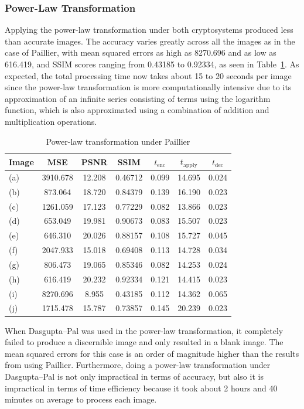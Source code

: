 \subsubsection{Power-Law Transformation}
Applying the power-law transformation under both cryptosystems produced less than accurate images. The accuracy varies greatly across all the images as in the case of Paillier, with mean squared errors as high as 8270.696 and as low as 616.419, and SSIM scores ranging from 0.43185 to 0.92334, as seen in Table~\ref{tbl:pwr-pal}. As expected, the total processing time now takes about 15 to 20 seconds per image since the power-law transformation is more computationally intensive due to its approximation of an infinite series consisting of terms using the logarithm function, which is also approximated using a combination of addition and multiplication operations.

\begin{table}[h]
	\centering
	\caption{Power-law transformation under Paillier}
	\label{tbl:pwr-pal}
    \begin{tabular}{lcccccc}
        \toprule
        Image & MSE  & PSNR & SSIM & $t_\text{enc}$ & $t_\text{apply}$ & $t_\text{dec}$ \\ \midrule
        (a) & 3910.678 & 12.208 & 0.46712 & 0.099 & 14.695 & 0.024 \\
		(b) & 873.064 & 18.720 & 0.84379 & 0.139 & 16.190 & 0.023 \\
		(c) & 1261.059 & 17.123 & 0.77229 & 0.082 & 13.866 & 0.023 \\
		(d) & 653.049 & 19.981 & 0.90673 & 0.083 & 15.507 & 0.023 \\
		(e) & 646.310 & 20.026 & 0.88157 & 0.108 & 15.727 & 0.045 \\
		(f) & 2047.933 & 15.018 & 0.69408 & 0.113 & 14.728 & 0.034 \\
		(g) & 806.473 & 19.065 & 0.85346 & 0.082 & 14.253 & 0.024 \\
		(h) & 616.419 & 20.232 & 0.92334 & 0.121 & 14.415 & 0.023 \\
		(i) & 8270.696 & 8.955 & 0.43185 & 0.112 & 14.362 & 0.065 \\
		(j) & 1715.478 & 15.787 & 0.73857 & 0.145 & 20.239 & 0.023 \\
		\bottomrule
        \end{tabular}
\end{table}

When Dasgupta--Pal was used in the power-law transformation, it completely failed to produce a discernible image and only resulted in a blank image. The mean squared errors for this case is an order of magnitude higher than the results from using Paillier. Furthermore, doing a power-law transformation under Dasgupta--Pal is not only impractical in terms of accuracy, but also it is impractical in terms of time efficiency because it took about 2 hours and 40 minutes on average to process each image.

